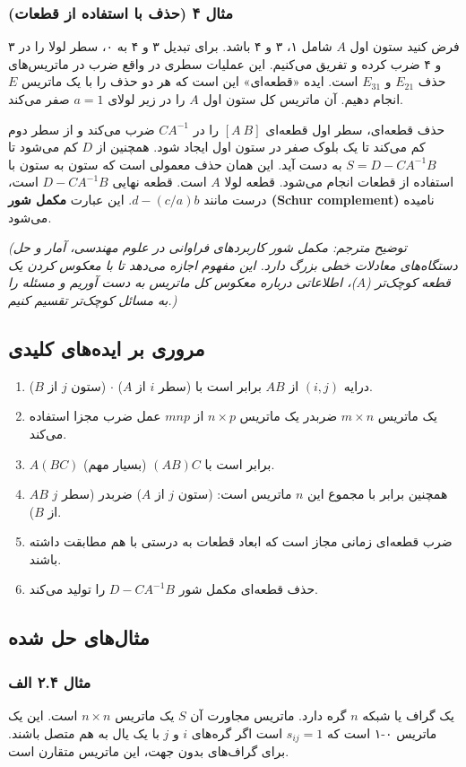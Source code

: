 \documentclass[12pt, a4paper]{book}
\begin{document}
	\subsubsection*{مثال ۴ (حذف با استفاده از قطعات)}
	فرض کنید ستون اول $A$ شامل ۱، ۳ و ۴ باشد. برای تبدیل ۳ و ۴ به ۰، سطر لولا را در ۳ و ۴ ضرب کرده و تفریق می‌کنیم. این عملیات سطری در واقع ضرب در ماتریس‌های حذف $E_{21}$ و $E_{31}$ است. ایده «قطعه‌ای» این است که هر دو حذف را با یک ماتریس $E$ انجام دهیم. آن ماتریس کل ستون اول $A$ را در زیر لولای $a=1$ صفر می‌کند.
	
	حذف قطعه‌ای، سطر اول قطعه‌ای $[A \ B]$ را در $CA^{-1}$ ضرب می‌کند و از سطر دوم کم می‌کند تا یک بلوک صفر در ستون اول ایجاد شود. همچنین از $D$ کم می‌شود تا $S = D - CA^{-1}B$ به دست آید. این همان حذف معمولی است که ستون به ستون با استفاده از قطعات انجام می‌شود. قطعه لولا $A$ است. قطعه نهایی $D - CA^{-1}B$ است، درست مانند $d - (c/a)b$. این عبارت \textbf{مکمل شور (Schur complement)} نامیده می‌شود.
	
	\textit{(توضیح مترجم: مکمل شور کاربردهای فراوانی در علوم مهندسی، آمار و حل دستگاه‌های معادلات خطی بزرگ دارد. این مفهوم اجازه می‌دهد تا با معکوس کردن یک قطعه کوچک‌تر ($A$)، اطلاعاتی درباره معکوس کل ماتریس به دست آوریم و مسئله را به مسائل کوچک‌تر تقسیم کنیم.)}
	
	\subsection*{مروری بر ایده‌های کلیدی}
	\begin{enumerate}
		\item درایه $(i,j)$ از $AB$ برابر است با (سطر $i$ از $A$) $\cdot$ (ستون $j$ از $B$).
		\item یک ماتریس $m \times n$ ضربدر یک ماتریس $n \times p$ از $mnp$ عمل ضرب مجزا استفاده می‌کند.
		\item $A(BC)$ برابر است با $(AB)C$ (بسیار مهم).
		\item $AB$ همچنین برابر با مجموع این $n$ ماتریس است: (ستون $j$ از $A$) ضربدر (سطر $j$ از $B$).
		\item ضرب قطعه‌ای زمانی مجاز است که ابعاد قطعات به درستی با هم مطابقت داشته باشند.
		\item حذف قطعه‌ای مکمل شور $D-CA^{-1}B$ را تولید می‌کند.
	\end{enumerate}
	
	\subsection*{مثال‌های حل شده}
	\subsubsection*{مثال ۲.۴ الف}
	یک گراف یا شبکه $n$ گره دارد. ماتریس مجاورت آن $S$ یک ماتریس $n \times n$ است. این یک ماتریس ۰-۱ است که $s_{ij}=1$ است اگر گره‌های $i$ و $j$ با یک یال به هم متصل باشند. برای گراف‌های بدون جهت، این ماتریس متقارن است.
	
\end{document}
